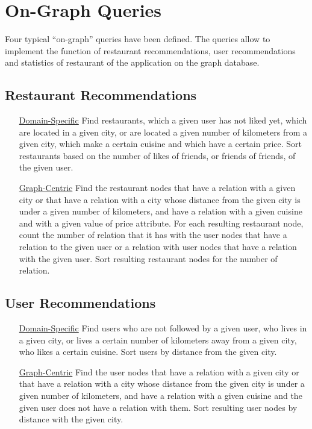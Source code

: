 \section{On-Graph Queries}

Four typical ``on-graph'' queries have been defined. The queries allow to
implement the function of restaurant recommendations, user recommendations and
statistics of restaurant of the application on the graph database.

\subsection{Restaurant Recommendations}
\begin{itemize}
	\item [\underline{Domain-Specific}] Find restaurants, which a given user
		has not liked yet, which are located in a given city, or are
		located a given number of kilometers from a given city, which
		make a certain cuisine and which have a certain price.  Sort
		restaurants based on the number of likes of friends, or friends
		of friends, of the given user.
	\item [\underline{Graph-Centric}] Find the restaurant nodes that have a
		 relation with a given city or that have a
		 relation with a city whose distance from the
		given city is under a given number of kilometers, and have a
		 relation with a given cuisine and with a given
		value of price attribute. For each resulting restaurant node,
		count the number of  relation that it has with the
		user nodes that have a  relation to the given user
		or a  relation with user nodes that have a
		 relation with the given user. Sort resulting
		restaurant nodes for the number of  relation.
\end{itemize}

\subsection{User Recommendations}
\begin{itemize}
	\item [\underline{Domain-Specific}] Find users who are not followed by a
		given user, who lives in a given city, or lives a certain number
		of kilometers away from a given city, who likes a certain
		cuisine. Sort users by distance from the given city.
	\item [\underline{Graph-Centric}] Find the user nodes that have a
		 relation with a given city or that have a
		 relation with a city whose distance from the
		given city is under a given number of kilometers, and have a
		 relation with a given cuisine and the given user
		does not have a  relation with them. Sort
		resulting user nodes by distance with the given city.
\end{itemize}

